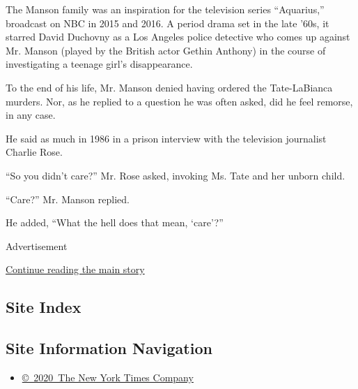 The Manson family was an inspiration for the television series
``Aquarius,'' broadcast on NBC in 2015 and 2016. A period drama set in
the late '60s, it starred David Duchovny as a Los Angeles police
detective who comes up against Mr. Manson (played by the British actor
Gethin Anthony) in the course of investigating a teenage girl's
disappearance.

To the end of his life, Mr. Manson denied having ordered the
Tate-LaBianca murders. Nor, as he replied to a question he was often
asked, did he feel remorse, in any case.

He said as much in 1986 in a prison interview with the television
journalist Charlie Rose.

``So you didn't care?'' Mr. Rose asked, invoking Ms. Tate and her unborn
child.

``Care?'' Mr. Manson replied.

He added, ``What the hell does that mean, `care'?''

Advertisement

\protect\hyperlink{after-bottom}{Continue reading the main story}

\hypertarget{site-index}{%
\subsection{Site Index}\label{site-index}}

\hypertarget{site-information-navigation}{%
\subsection{Site Information
Navigation}\label{site-information-navigation}}

\begin{itemize}
\tightlist
\item
  \href{https://help.nytimes3xbfgragh.onion/hc/en-us/articles/115014792127-Copyright-notice}{©~2020~The
  New York Times Company}
\end{itemize}

